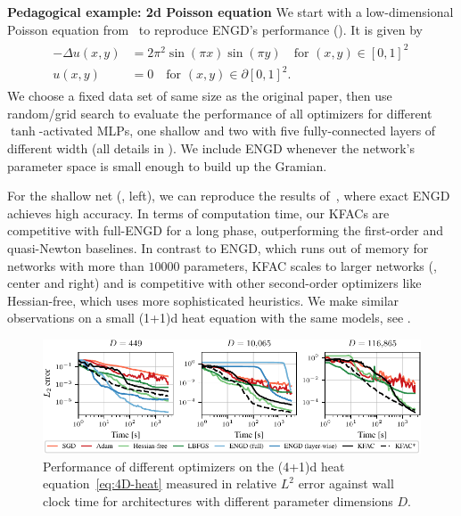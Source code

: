 \textbf{Pedagogical example: 2d Poisson equation}
We start with a low-dimensional Poisson equation from~\citet{muller2023achieving} to reproduce ENGD's performance ().
It is given by
\begin{align}\label{eq:2D-Poisson}
  \begin{split}
    -\Delta u(x,y)
    &=
      2\pi^2 \sin(\pi x) \sin(\pi y) \quad \text{for } (x,y)\in[0,1]^2\,
    \\
    u(x,y)
    &=
      0 \quad \text{for } (x,y) \in\partial[0,1]^2.
  \end{split}
\end{align}
We choose a fixed data set of same size as the original paper, then use random/grid search to evaluate the performance of all optimizers for different $\tanh$-activated MLPs, one shallow and two with five fully-connected layers of different width (all details in ).
We include ENGD whenever the network's parameter space is small enough to build up the Gramian.

For the shallow net (, left), we can reproduce the results of~\cite{muller2023achieving}, where exact ENGD achieves high accuracy.
In terms of computation time, our KFACs are competitive with full-ENGD for a long phase, outperforming the first-order and quasi-Newton baselines.
In contrast to ENGD, which runs out of memory for networks with more than $\num{10000}$ parameters, KFAC scales to larger networks (, center and right) and is competitive with other second-order optimizers like Hessian-free, which uses more sophisticated heuristics.
We make similar observations on a small (1+1)d heat equation with the same models, see .

\begin{figure}
  \centering
  \includegraphics{kfac_pinns_exp/exp30_heat4d_groupplot/l2_error_over_time.pdf}
  \caption{Performance of different optimizers on the (4+1)d heat equation~\eqref{eq:4D-heat} measured in relative $L^2$ error against wall clock time for architectures with different parameter dimensions $D$.}
  \label{fig:4D-heat}
\end{figure}


